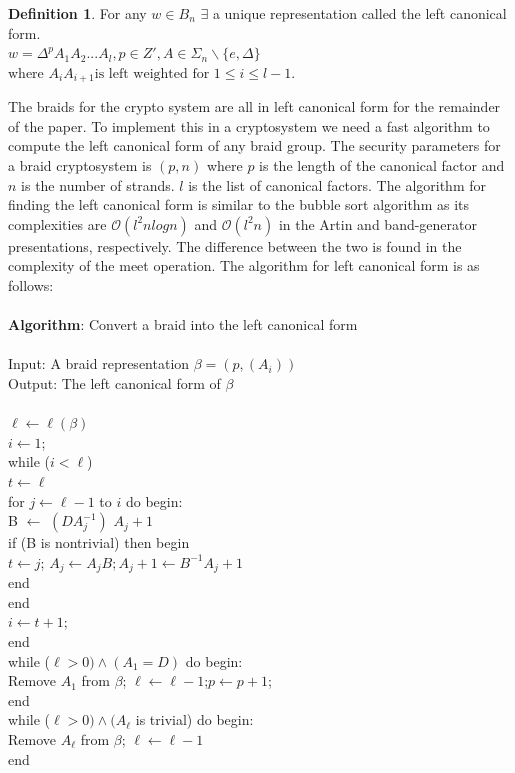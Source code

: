 \documentclass{article}
\theoremstyle{definition}
\newtheorem{definition}{Definition}[section]
\begin{document}
	\begin{definition}	
	For any $w \in B_n$ $\exists$ a unique representation called the left canonical form.
	\\$w = \Delta^p A_1 A_2 ... A_l, p \in Z', A \in \Sigma_n \backslash \{ e, \Delta \} $
	$\text{where } A_i A_{i+1} \text{is left weighted for } 1 \leq i \leq l - 1.$
	\end{definition}
	
	The braids for the crypto system are all in left canonical form for the remainder of the paper. To implement this in a cryptosystem we need a fast algorithm to compute the left canonical form of any braid group. The security parameters for a braid cryptosystem is $(p,n)$ where $p$ is the length of the canonical factor and $n$ is the number of strands. $l$ is the list of canonical factors. The algorithm for finding the left canonical form is similar to the bubble sort algorithm as its complexities are $\mathcal{O}(l^2 n log{}n)$ and $\mathcal{O}(l^2 n)$ in the Artin and band-generator presentations, respectively. The difference between the two is found in the complexity of the meet operation. The algorithm for left canonical form is as follows:
	\\
	\\  \textbf{Algorithm}: Convert a braid into the left canonical form
	\\
	\\ \indent Input: A braid representation $\beta = (p, (A_i))$
	\\ \indent Output: The left canonical form of $\beta$
	\\
	\\ \indent $\ell \leftarrow \ell(\beta)$
	\\ \indent $i \leftarrow 1$;
	\\ \indent while ($i < \ell$)
	\\ \indent \indent $t \leftarrow \ell$
	\\ \indent  \indent for $ j \leftarrow \ell - 1$ to $i$ do begin:
	\\ \indent \indent \indent B $\leftarrow$ $(DA_j^{-1})$ $A_j+1$
	\\ \indent \indent \indent if (B is nontrivial) then begin
	\\ \indent \indent \indent \indent $t \leftarrow j$; $A_j \leftarrow A_j B; A_j+1 \leftarrow B^{-1} A_j+1$
	\\\indent \indent \indent end
	\\\indent \indent end
	\\ \indent $i \leftarrow t + 1$;
	\\ \indent end
	\\ \indent while ($\ell > 0) \land (A_1 = D)$ do begin:
	\\  \indent \indent Remove $A_1$ from $\beta$; $\ell \leftarrow \ell -1$;$p \leftarrow p +1$;
	\\ \indent end
	\\ \indent while ($\ell > 0) \land (A_\ell$ is trivial) do begin:
	\\ \indent \indent Remove $A_\ell$ from $\beta$; $\ell \leftarrow \ell -1$
	\\ \indent end
	
\end{document}
